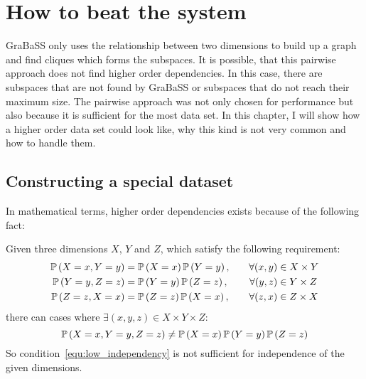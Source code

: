 \chapter{How to beat the system}
GraBaSS only uses the relationship between two dimensions to build up a graph and find cliques which forms the subspaces. It is possible, that this pairwise approach does not find higher order dependencies. In this case, there are subspaces that are not found by GraBaSS or subspaces that do not reach their maximum size. The pairwise approach was not only chosen for performance but also because it is sufficient for the most data set. In this chapter, I will show how a higher order data set could look like, why this kind is not very common and how to handle them.

\section{Constructing a special dataset}\label{sec:constr}
In mathematical terms, higher order dependencies exists because of the following fact:
\begin{envtheo}\label{theo:lowdep}
	Given three dimensions $X$, $Y$ and $Z$, which satisfy the following requirement:
	\begin{equation}\label{equ:low_independency}
		\begin{aligned}
			\mathbb{P}\left(X = x, Y = y\right) &= \mathbb{P}\left(X = x\right) \mathbb{P}\left(Y = y\right),\quad & \forall (x,y) &\in X \times Y \\
			\mathbb{P}\left(Y = y, Z = z\right) &= \mathbb{P}\left(Y = y\right) \mathbb{P}\left(Z = z\right),\quad & \forall (y,z) &\in Y \times Z \\
			\mathbb{P}\left(Z = z, X = x\right) &= \mathbb{P}\left(Z = z\right) \mathbb{P}\left(X = x\right),\quad & \forall (z,x) &\in Z \times X
		\end{aligned}
	\end{equation}
	there can cases where $\exists (x,y,z) \in X \times Y \times Z$:
	\begin{equation}
		\mathbb{P}\left(X = x, Y = y, Z = z\right) \neq \mathbb{P}\left(X = x\right) \mathbb{P}\left(Y = y\right) \mathbb{P}\left(Z = z\right)
	\end{equation}
	So condition~\ref{equ:low_independency} is not sufficient for independence of the given dimensions.
\end{envtheo}

